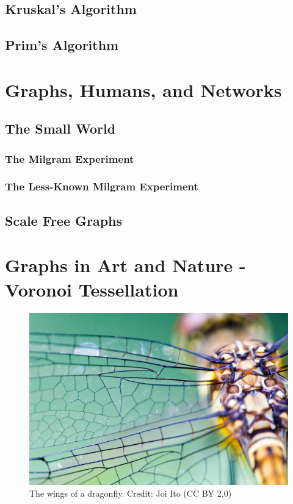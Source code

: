 \documentclass[10pt,a4paper]{book}
\begin{document}
\subsection{Kruskal's Algorithm}
\subsection{Prim's Algorithm }



\section{Graphs, Humans, and Networks}

\subsection{The Small World}
\subsubsection{The Milgram Experiment}
\subsubsection{The Less-Known Milgram Experiment}

\subsection{Scale Free Graphs}


\section{Graphs in Art and Nature - Voronoi Tessellation}

\begin{figure}
	\centering
	\includegraphics[width=0.7\linewidth]{pics/dragonfly_wing_joi_ito}
	\caption{The wings of a dragonfly. Credit: Joi Ito (CC BY 2.0)}
	\label{fig:dragonflywingjoiito}
\end{figure}
\end{document}
